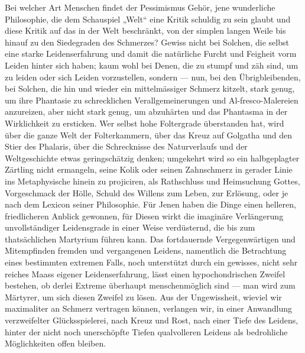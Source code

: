 Bei welcher Art Menschen findet der Pessimismus Gehör, jene wunderliche Philosophie, die dem Schauspiel „Welt“ eine Kritik schuldig zu sein glaubt und diese Kritik auf das  in der Welt beschränkt, von der simplen langen Weile bis hinauf zu den Siedegraden des Schmerzes? Gewiss nicht bei Solchen, die selbst eine starke Leidenserfahrung und damit die natürliche Furcht und Feigheit vorm Leiden hinter sich haben; kaum wohl bei Denen, die zu stumpf und zäh sind, um zu leiden oder sich Leiden vorzustellen, sondern — nun, bei den Übrigbleibenden, bei Solchen, die hin und wieder ein mittelmässiger Schmerz kitzelt, stark genug, um ihre Phantasie zu schrecklichen Verallgemeinerungen und Al-fresco-Malereien anzureizen, aber nicht stark genug, um abzuhärten und das Phantasma in der Wirklichkeit zu ersticken. Wer selbst hohe Foltergrade überstanden hat, wird über die ganze Welt der Folterkammern, über das Kreuz auf Golgatha und den Stier des Phalaris, über die Schrecknisse des Naturverlaufs und der Weltgeschichte etwas geringschätzig denken; umgekehrt wird so ein halbgeplagter Zärtling nicht ermangeln, seine Kolik oder seinen Zahnschmerz in gerader Linie ins Metaphysische hinein zu projiciren, als Rathschluss und Heimsuchung Gottes, Vorgeschmack der Hölle, Schuld des Willens zum Leben,   zur Erlösung, oder je nach dem Lexicon seiner Philosophie. Für Jenen haben die Dinge einen helleren, friedlicheren Anblick gewonnen, für Diesen wirkt die imaginäre Verlängerung unvollständiger Leidensgrade in einer Weise verdüsternd, die bis zum thatsächlichen Martyrium führen kann. Das fortdauernde Vergegenwärtigen und Mitempfinden fremden und vergangenen Leidens, namentlich die Betrachtung eines bestimmten extremen Falls, noch unterstützt durch ein gewisses, nicht sehr reiches Maass eigener Leidenserfahrung, lässt einen hypochondrischen Zweifel bestehen, ob derlei Extreme überhaupt menschenmöglich sind — man wird zum Märtyrer, um sich diesen Zweifel zu lösen. Aus der Ungewissheit, wieviel wir maximaliter an Schmerz vertragen können, verlangen wir, in einer Anwandlung verzweifelter Glücksspielerei, nach Kreuz und Rost, nach einer Tiefe des Leidens, hinter der nicht noch unerschöpfte Tiefen qualvolleren Leidens als bedrohliche Möglichkeiten offen bleiben.
\par

